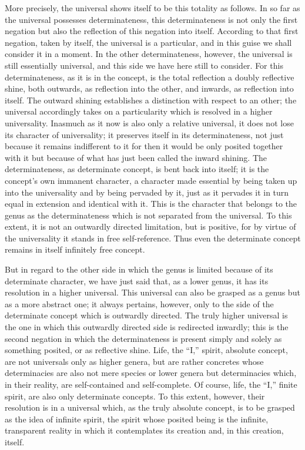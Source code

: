 More precisely, the universal shows itself
to be this totality as follows.
In so far as the universal possesses determinateness,
this determinateness is not only the first negation
but also the reflection of this negation into itself.
According to that first negation, taken by itself,
the universal is a particular,
and in this guise we shall consider it in a moment.
In the other determinateness, however,
the universal is still essentially universal,
and this side we have here still to consider.
For this determinateness, as it is in the concept,
is the total reflection a doubly reflective shine,
both outwards, as reflection into the other,
and inwards, as reflection into itself.
The outward shining establishes a distinction
with respect to an other;
the universal accordingly takes on a particularity
which is resolved in a higher universality.
Inasmuch as it now is also only a relative universal,
it does not lose its character of universality;
it preserves itself in its determinateness,
not just because it remains indifferent to it
for then it would be only posited together with it
but because of what has just been called the inward shining.
The determinateness, as determinate concept,
is bent back into itself;
it is the concept's own immanent character,
a character made essential by
being taken up into the universality
and by being pervaded by it,
just as it pervades it in turn
equal in extension and identical with it.
This is the character that belongs to the genus
as the determinateness which is not
separated from the universal.
To this extent, it is not an outwardly directed limitation,
but is positive, for by virtue of the universality
it stands in free self-reference.
Thus even the determinate concept remains
in itself infinitely free concept.

But in regard to the other side
in which the genus is limited
because of its determinate character,
we have just said that, as a lower genus,
it has its resolution in a higher universal.
This universal can also be grasped as a genus
but as a more abstract one;
it always pertains, however, only to
the side of the determinate concept
which is outwardly directed.
The truly higher universal is the one in which
this outwardly directed side is redirected inwardly;
this is the second negation in which
the determinateness is present simply and solely
as something posited, or as reflective shine.
Life, the “I,” spirit, absolute concept,
are not universals only as higher genera,
but are rather concretes whose determinacies are
also not mere species or lower genera
but determinacies which, in their reality,
are self-contained and self-complete.
Of course, life, the “I,” finite spirit,
are also only determinate concepts.
To this extent, however, their resolution is
in a universal which, as the truly absolute concept,
is to be grasped as the idea of infinite spirit,
the spirit whose posited being is
the infinite, transparent reality
in which it contemplates its creation
and, in this creation, itself.

